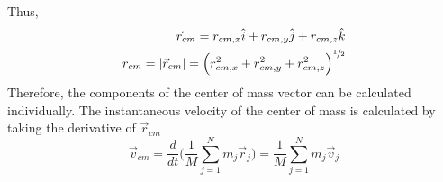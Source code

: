 \documentclass[a4paper]{article}
\begin{document}
Thus, 
\begin{align*}
    \vec{r}_{cm} = r_{cm,x}\hat{i} + r_{cm,y}\hat{j} + r_{cm,z}\hat{k}\\
    r_{cm} = |\vec{r}_{cm}| = \Big(r^2_{cm,x} + r^2_{cm,y} + r^2_{cm,z}\Big)^{\sfrac{1}{2}}
\end{align*}
Therefore, the components of the center of mass vector can be calculated individually. The instantaneous velocity of the center of mass is calculated by taking the derivative of $\vec{r}_{cm}$
\begin{equation}
    \vec{v}_{cm} = \frac{d}{dt}\bigg(\frac{1}{M}\sum_{j = 1}^{N}m_j\vec{r}_j\bigg) = \frac{1}{M}\sum_{j = 1}^{N}m_j\vec{v}_j
\end{equation}
\end{document}
